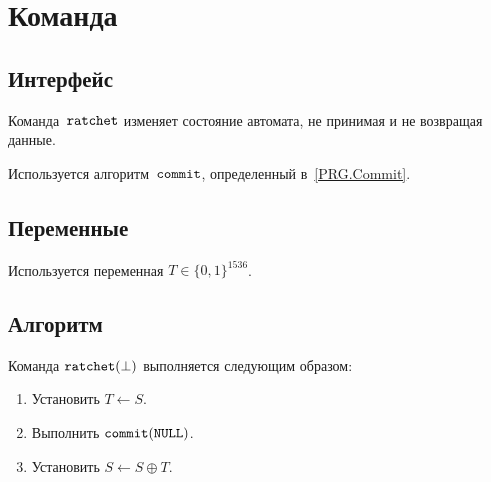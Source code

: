 \section{Команда }\label{PRG.Ratchet}

\subsection{Интерфейс}\label{PRG.Ratchet.IFace}

Команда~$\texttt{ratchet}$ изменяет состояние автомата,
не принимая и не возвращая данные.

Используется алгоритм~$\texttt{commit}$, определенный в~\ref{PRG.Commit}.

\subsection{Переменные}\label{PRG.Ratchet.Vars}

Используется переменная $T\in\{0,1\}^{1536}$.

\subsection{Алгоритм}\label{PRG.Ratchet.Alg}

Команда $\texttt{ratchet}(\perp)$ выполняется следующим образом:
\begin{enumerate}
\item
Установить
$T\leftarrow S$.
\item
Выполнить
$\texttt{commit}(\texttt{NULL})$.
\item
Установить
$S\leftarrow S\oplus T$.
%
%
\end{enumerate}
